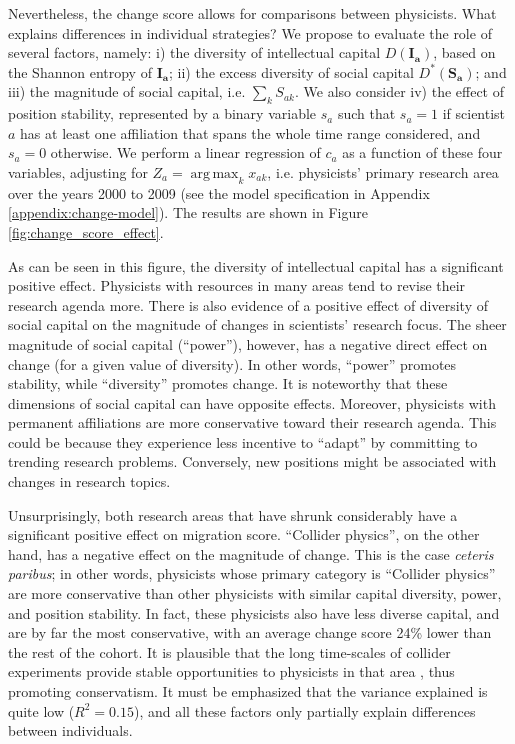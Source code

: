\documentclass{article}
\DeclareMathOperator*{\argmax}{arg\,max}
\begin{document}
Nevertheless, the change score allows for comparisons between physicists. What explains differences in individual strategies? We propose to evaluate the role of several factors, namely: i) the diversity of intellectual capital $D(\bm{I_a})$, based on the Shannon entropy of $\bm{I_a}$; ii) the excess diversity of social capital $D^{\ast}(\bm{S_a})$; and iii) the magnitude of social capital, i.e. $\sum_k S_{ak}$. We also consider iv) the effect of position stability, represented by a binary variable $s_a$ such that $s_a=1$ if scientist $a$ has at least one affiliation that spans the whole time range considered, and $s_a=0$ otherwise. We perform a linear regression of $c_a$ as a function of these four variables, adjusting for $Z_a=\argmax_{k} x_{ak}$, i.e. physicists' primary research area over the years 2000 to 2009 (see the model specification in Appendix \ref{appendix:change-model}). The results are shown in Figure \ref{fig:change_score_effect}.

As can be seen in this figure, the diversity of intellectual capital has a significant positive effect. Physicists with resources in many areas tend to revise their research agenda more. There is also evidence of a positive effect of diversity of social capital on the magnitude of changes in scientists' research focus. The sheer magnitude of social capital (``power''), however, has a negative direct effect on change (for a given value of diversity). In other words, ``power'' promotes stability, while ``diversity'' promotes change. It is noteworthy that these dimensions of social capital can have opposite effects. Moreover, physicists with permanent affiliations are more conservative toward their research agenda. This could be because they experience less incentive to ``adapt'' by committing to trending research problems. Conversely, new positions might be associated with changes in research topics.

Unsurprisingly, both research areas that have shrunk considerably have a significant positive effect on migration score. ``Collider physics'', on the other hand, has a negative effect on the magnitude of change. This is the case \textit{ceteris paribus}; in other words, physicists whose primary category is ``Collider physics'' are more conservative than other physicists with similar capital diversity, power, and position stability. In fact, these physicists also have less diverse capital, and are by far the most conservative, with an average change score 24\% lower than the rest of the cohort. It is plausible that the long time-scales of collider experiments provide stable opportunities to physicists in that area \citep[p.~138]{galison1987how}, thus promoting conservatism. It must be emphasized that the variance explained is quite low ($R^2=0.15$), and all these factors only partially explain differences between individuals.
\end{document}
